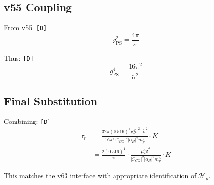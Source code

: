 \documentclass[11pt,a4paper]{article}
\newcommand{\tagD}{\textcolor{green!50!black}{\texttt{[D]}}}
\theoremstyle{definition}
\begin{document}
\subsection{v55 Coupling}
\label{app:v55-coupling}

From v55: \tagD{}
\begin{equation}
\label{eq:v55-gps}
g_{\text{PS}}^2 = \frac{4\pi}{\tilde{\sigma}}
\end{equation}

Thus: \tagD{}
\begin{equation}
\label{eq:gps-fourth-v55}
g_{\text{PS}}^4 = \frac{16\pi^2}{\tilde{\sigma}^2}
\end{equation}

\subsection{Final Substitution}
\label{app:final-subst}

Combining: \tagD{}
\begin{align}
\label{eq:final-subst-1}
\tau_p &= \frac{32\pi (0.516)^4 \mu_*^4 \tilde{\sigma}^2 \cdot \tilde{\sigma}^2}{16\pi^2 |C_{CG}|^2 |\alpha_H|^2 m_p^5} \cdot K \\
\label{eq:final-subst-2}
&= \frac{2 (0.516)^4}{\pi} \cdot \frac{\mu_*^4 \tilde{\sigma}^4}{|C_{CG}|^2 |\alpha_H|^2 m_p^5} \cdot K
\end{align}

This matches the v63 interface with appropriate identification of $\mathcal{H}_p$.

\end{document}
